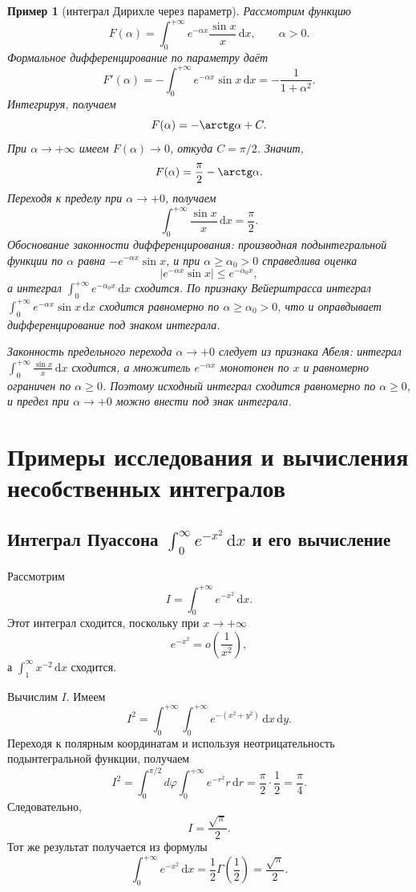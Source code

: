 \documentclass[coursework, och, times]{SCWorks1}
\newtheorem{example}{Пример}
\newcommand{\dd}{\,\mathrm{d}}
\renewcommand{\le}{\leqslant}
\renewcommand{\ge}{\geqslant}
\begin{document}
\begin{example}[интеграл Дирихле через параметр]\label{ex:param}
Рассмотрим функцию
\[
F(\alpha)=\int_0^{+\infty}e^{-\alpha x}\frac{\sin x}{x}\dd x,\qquad \alpha>0.
\]
Формальное дифференцирование по параметру даёт
\[
F'(\alpha)=-\int_0^{+\infty}e^{-\alpha x}\sin x\dd x
= -\frac{1}{1+\alpha^2}.
\]
Интегрируя, получаем
\[
F(\alpha)=-\arctg\alpha+C.
\]
При \(\alpha\to+\infty\) имеем \(F(\alpha)\to 0\), откуда \(C=\pi/2\). Значит,
\[
F(\alpha)=\frac{\pi}{2}-\arctg\alpha.
\]
Переходя к пределу при \(\alpha\to+0\), получаем
\[
\int_0^{+\infty}\frac{\sin x}{x}\dd x=\frac{\pi}{2}.
\]
Обоснование законности дифференцирования: производная подынтегральной функции
по \(\alpha\) равна \(-e^{-\alpha x}\sin x\), и при \(\alpha\ge\alpha_0>0\)
справедлива оценка
\[
\left|e^{-\alpha x}\sin x\right|\le e^{-\alpha_0 x},
\]
а интеграл \(\int_0^{+\infty}e^{-\alpha_0 x}\dd x\) сходится. По признаку
Вейерштрасса интеграл \(\int_0^{+\infty}e^{-\alpha x}\sin x\dd x\) сходится
равномерно по \(\alpha\ge\alpha_0>0\), что и оправдывает дифференцирование
под знаком интеграла.

Законность предельного перехода \(\alpha\to+0\) следует из признака Абеля:
интеграл \(\int_0^{+\infty}\frac{\sin x}{x}\dd x\) сходится, а множитель
\(e^{-\alpha x}\) монотонен по \(x\) и равномерно ограничен по \(\alpha\ge0\).
Поэтому исходный интеграл сходится равномерно по \(\alpha\ge0\), и предел
при \(\alpha\to+0\) можно внести под знак интеграла.
\end{example}

\section{Примеры исследования и вычисления несобственных интегралов}

\subsection{Интеграл Пуассона $\int_{0}^{\infty} e^{-x^{2}} \dd x$ и его вычисление}

Рассмотрим
\[
I=\int_0^{+\infty}e^{-x^2}\dd x.
\]
Этот интеграл сходится, поскольку при \(x\to+\infty\)
\[
e^{-x^2}=o\left(\frac1{x^2}\right),
\]
а \(\int_1^\infty x^{-2}\dd x\) сходится.

Вычислим \(I\). Имеем
\[
I^2=\int_0^{+\infty}\int_0^{+\infty}e^{-(x^2+y^2)}\dd x\dd y.
\]
Переходя к полярным координатам и используя неотрицательность подынтегральной функции, получаем
\[
I^2=\int_0^{\pi/2}d\varphi\int_0^{+\infty}e^{-r^2}r\dd r
=
\frac{\pi}{2}\cdot\frac12
=
\frac{\pi}{4}.
\]
Следовательно,
\[
I=\frac{\sqrt{\pi}}{2}.
\]
Тот же результат получается из формулы
\[
\int_0^{+\infty}e^{-x^2}\dd x
=
\frac12\Gamma\left(\frac12\right)
=
\frac{\sqrt{\pi}}{2}.
\]
\end{document}
